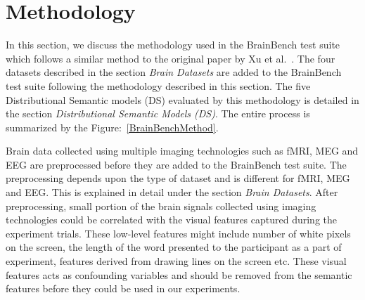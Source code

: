 \section{Methodology}

In this section, we discuss the methodology used in the BrainBench test suite which follows a similar method to the original paper by Xu et al.~\cite{BrainBench2016}. The four datasets described in the section \textit{Brain Datasets} are added to the BrainBench test suite following the methodology described in this section. The five Distributional Semantic models (DS) evaluated by this methodology is detailed in the section \textit{Distributional Semantic Models (DS)}. The entire process is summarized by the Figure:~\ref{BrainBenchMethod}.

Brain data collected using multiple imaging technologies such as fMRI, MEG and EEG are preprocessed before they are added to the BrainBench test suite. The preprocessing depends upon the type of dataset and is different for fMRI, MEG and EEG. This is explained in detail under the section \textit{Brain Datasets}. After preprocessing, small portion of the brain signals collected using imaging technologies could be correlated with the visual features captured during the experiment trials. These low-level features might include number of white pixels on the screen, the length of the word presented to the participant as a part of experiment, features derived from drawing lines on the screen \cite{SUDRE2012451} etc. These visual features acts as confounding variables and should be removed from the semantic features before they could be used in our experiments.


